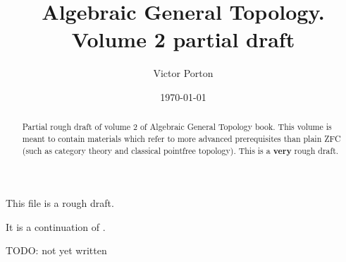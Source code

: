 \documentclass[a4paper,oneside,english,reqno]{amsbook}
\begin{document}
\title{Algebraic General Topology. Volume 2 partial draft}

\author{Victor Porton}





\date{\today}


\begin{abstract}
Partial rough draft of volume 2 of Algebraic General Topology book.
This volume is meant to contain materials which refer to more advanced
prerequisites than plain ZFC (such as category theory and classical pointfree
topology). This is a \textbf{very} rough draft.
\end{abstract}





\maketitle

\tableofcontents{}

This file is a rough draft.

It is a continuation of \cite{volume-1}.
















TODO: not yet written




\end{document}
